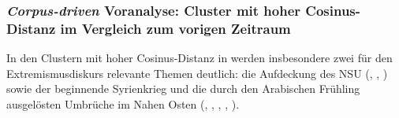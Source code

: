 \subsubsection{\texorpdfstring{\emph{Corpus-driven} Voranalyse: Cluster mit hoher Cosinus-Distanz im Vergleich zum vorigen Zeitraum}{Corpus-driven Voranalyse: Cluster mit hoher Cosinus-Distanz im Vergleich zum vorigen Zeitraum}}\label{corpus-driven-voranalyse-cluster-mit-hoher-cosinus-distanz-im-vergleich-zum-vorigen-zeitraum-3}

In den Clustern mit hoher Cosinus-Distanz in  werden insbesondere zwei für den Extremismusdiskurs relevante Themen deutlich: die Aufdeckung des NSU (, , ) sowie der beginnende Syrienkrieg und die durch den Arabischen Frühling ausgelösten Umbrüche im Nahen Osten (, , , , ).

